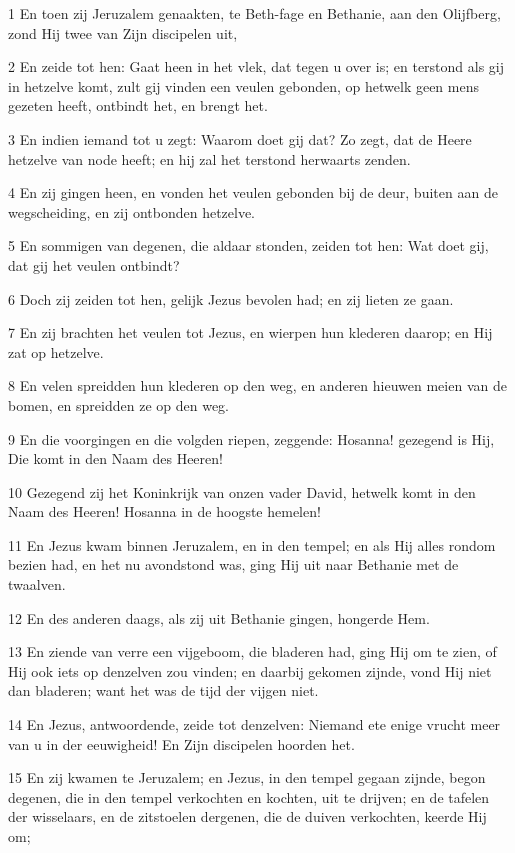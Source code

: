 \par 1 En toen zij Jeruzalem genaakten, te Beth-fage en Bethanie, aan den Olijfberg, zond Hij twee van Zijn discipelen uit,
\par 2 En zeide tot hen: Gaat heen in het vlek, dat tegen u over is; en terstond als gij in hetzelve komt, zult gij vinden een veulen gebonden, op hetwelk geen mens gezeten heeft, ontbindt het, en brengt het.
\par 3 En indien iemand tot u zegt: Waarom doet gij dat? Zo zegt, dat de Heere hetzelve van node heeft; en hij zal het terstond herwaarts zenden.
\par 4 En zij gingen heen, en vonden het veulen gebonden bij de deur, buiten aan de wegscheiding, en zij ontbonden hetzelve.
\par 5 En sommigen van degenen, die aldaar stonden, zeiden tot hen: Wat doet gij, dat gij het veulen ontbindt?
\par 6 Doch zij zeiden tot hen, gelijk Jezus bevolen had; en zij lieten ze gaan.
\par 7 En zij brachten het veulen tot Jezus, en wierpen hun klederen daarop; en Hij zat op hetzelve.
\par 8 En velen spreidden hun klederen op den weg, en anderen hieuwen meien van de bomen, en spreidden ze op den weg.
\par 9 En die voorgingen en die volgden riepen, zeggende: Hosanna! gezegend is Hij, Die komt in den Naam des Heeren!
\par 10 Gezegend zij het Koninkrijk van onzen vader David, hetwelk komt in den Naam des Heeren! Hosanna in de hoogste hemelen!
\par 11 En Jezus kwam binnen Jeruzalem, en in den tempel; en als Hij alles rondom bezien had, en het nu avondstond was, ging Hij uit naar Bethanie met de twaalven.
\par 12 En des anderen daags, als zij uit Bethanie gingen, hongerde Hem.
\par 13 En ziende van verre een vijgeboom, die bladeren had, ging Hij om te zien, of Hij ook iets op denzelven zou vinden; en daarbij gekomen zijnde, vond Hij niet dan bladeren; want het was de tijd der vijgen niet.
\par 14 En Jezus, antwoordende, zeide tot denzelven: Niemand ete enige vrucht meer van u in der eeuwigheid! En Zijn discipelen hoorden het.
\par 15 En zij kwamen te Jeruzalem; en Jezus, in den tempel gegaan zijnde, begon degenen, die in den tempel verkochten en kochten, uit te drijven; en de tafelen der wisselaars, en de zitstoelen dergenen, die de duiven verkochten, keerde Hij om;
